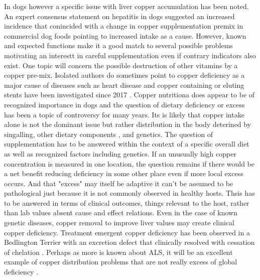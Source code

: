 {In dogs however a specific issue with liver copper accumulation has
been noted. 
An expert consensus statement on hepatitis in dogs suggested 
an increased incidence  that conincided with a change in copper supplementation
premix in commercial dog foods \cite{PMC6524396} pointing
to increased intake as a cause. 
However,  known and expected functions
make it a good   match to several possible problems 
motivating an interestt in careful supplementation  even if contrary
indicators also exist.  One topic will concern the possible
destruction of other vitamins by a copper pre-mix. 
Isolated authors do sometimes  point to copper deficiency  as a major
cause of diseases such as  heart disease
\cite{DiNicolantonioe000784}
\cite{PMC8838622}
and copper containing or eluting stents have been investigated 
since 2017
\cite{Jin_Qi_Zhang_Evaluation_promoting_effect_2017}
. 
Copper nutritiona does appear to be of recognized importance in dogs
and the question of dietary deficiency or excess  
has been a topic of controversy for many years.  Its is  likely
that copper intake alone is not the dominant issue but rather
distribution in the body deterined by singalling, other dietary components
, and genetics.
The question of supplementation has to be answered within the context
of a specific overall diet  as well as recognized  factors including genetics.
If an unusually high copper concentration is measured  in one location, the question
remains if there  would be 
a net benefit reducing deficiency in some other place even if 
more local excess occurs. And that "excess" may itself be adaptive
it can't be assumed to be pathological just because it is not
commonly observed in healthy hosts.  
Thsis has to be answered in terms of clinical outcomes,
things relevant to the host, rather than lab values absent 
cause and effect relations.  
Even in the case of known genetic diseases,
copper removal to improve liver values may create clinical
copper deficiency. 
Treatment emergent copper deficiency has been observed in 
a Bedlington Terrier with an excretion defect 
that clinically resolved with cessation of chelation 
\cite{Seguin_Bunch_Iatrogenic_copper_deficiency_associated_2001}.
Perhaps as more is known about ALS, it will be an excellent
example of copper distribution problems that are
not really excess of global deficiency
\cite{10.3389/fnmol.2024.1408159}.
} %



